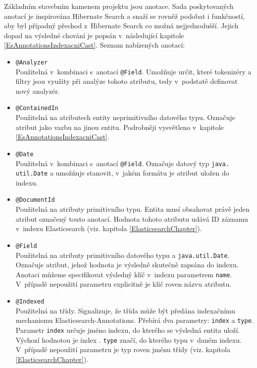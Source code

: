 \documentclass[11pt,oneside]{fithesis2}
\begin{document}
Základním stavebním kamenem projektu jsou anotace. Sada poskytovaných anotací je inspirována Hibernate Search a snaží se rovněž podobat i funkčností, aby byl případný přechod z~Hibernate Search co možná nejjednodušší. Jejich dopad na výsledné chování je popsán v~následující kapitole \ref{EsAnnotationsIndexacniCast}. Seznam nabízených anotací:
\begin{itemize}
	\item \texttt{@Analyzer} \\
	Použitelná v~kombinaci s~anotací \texttt{@Field}. Umožňuje určit, které tokenizéry a filtry jsou využity při analýze tohoto atributu, tedy v~podstatě definovat nový analyzér.

	\item \texttt{@ContainedIn} \\
	Použitelná na atributech entity neprimitivního datového typu. Označuje atribut jako vazbu na jinou entitu. Podrobněji vysvětleno v~kapitole \ref{EsAnnotationsIndexacniCast}.

	\item \texttt{@Date} \\
	Použitelná v~kombinaci s~anotací \texttt{@Field}. Označuje datový typ \texttt{java.\\util.Date} a umožňuje stanovit, v~jakém formátu je atribut uložen do indexu. 

	\item \texttt{@DocumentId} \\
	Použitelná na atributy primitivního typu. Entita musí obsahovat právě jeden atribut označený touto anotací. Hodnota tohoto atributu udává ID záznamu v~indexu Elasticsearch (viz. kapitola \ref{ElasticsearchChapter}).

	\item \texttt{@Field} \\
	Použitelná na atributy primitivního datového typu a \texttt{java.util.Date}. Označuje atribut, jehož hodnota je výsledně skutečně zapsána do indexu. Anotaci můžeme specifikovat výsledný klíč v~indexu parametrem \texttt{name}. V~případě nepoužití parametru explicitně je klíč roven názvu atributu.

	\item \texttt{@Indexed} \\
	Použitelná na třídy. Signalizuje, že třída může být předána indexačnímu mechanismu Elasticsearch-Annotations. Přebírá dva parametry: \texttt{index} a \texttt{type}. Parametr \texttt{index} určuje jméno indexu, do kterého se výsledná entita uloží. Výchozí hodnotou je 	index . \texttt{type} značí, do kterého typu v~daném indexu. V~případě nepoužití parametru je typ roven jménu třídy (viz. kapitola \ref{ElasticsearchChapter}).


\end{itemize}
\end{document}
